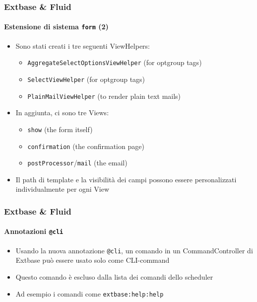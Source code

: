 \begin{frame}[fragile]
	\frametitle{Extbase \& Fluid}
	\framesubtitle{Estensione di sistema \texttt{form} (2)}

	\begin{itemize}

		\item Sono stati creati i tre seguenti ViewHelpers:

			\begin{itemize}
				\item \texttt{AggregateSelectOptionsViewHelper} (for optgroup tags)
				\item \texttt{SelectViewHelper} (for optgroup tags)
				\item \texttt{PlainMailViewHelper} (to render plain text mails)
			\end{itemize}

		\item In aggiunta, ci sono tre Views:

			\begin{itemize}
				\item \texttt{show} (the form itself)
				\item \texttt{confirmation} (the confirmation page)
				\item \texttt{postProcessor}/\texttt{mail} (the email)
			\end{itemize}

		\item Il path di template e la visibilità dei campi possono essere personalizzati
			individualmente per ogni View

	\end{itemize}

\end{frame}


\begin{frame}[fragile]
	\frametitle{Extbase \& Fluid}
	\framesubtitle{Annotazioni \texttt{@cli}}

	\begin{itemize}

		\item Usando la nuova annotazione \texttt{@cli}, un comando in un
			CommandController di Extbase può essere usato solo come CLI-command

		\item Questo comando è escluso dalla lista dei comandi dello scheduler

		\item Ad esempio i comandi come \texttt{extbase:help:help}

	\end{itemize}

\end{frame}

